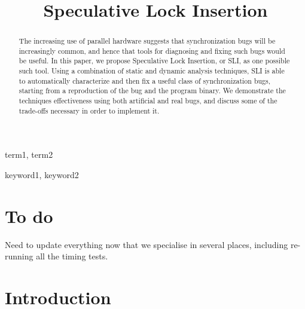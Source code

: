 \documentclass[10pt,twocolumn,preprint,natbib,authoryear]{sigplanconf}
\begin{document}
\copyrightdata{[to be supplied]} 


\title{Speculative Lock Insertion}

\authorinfo{}{}{}

\maketitle

\begin{abstract}

The increasing use of parallel hardware suggests that synchronization
bugs will be increasingly common, and hence that tools for diagnosing
and fixing such bugs would be useful.  In this paper, we propose
Speculative Lock Insertion, or SLI, as one possible such tool.  Using
a combination of static and dynamic analysis techniques, SLI is able
to automatically characterize and then fix a useful class of
synchronization bugs, starting from a reproduction of the bug and the
program binary.  We demonstrate the techniques effectiveness using
both artificial and real bugs, and discuss some of the trade-offs
necessary in order to implement it.

\end{abstract}


\terms
term1, term2

\keywords
keyword1, keyword2

\section{To do}

Need to update everything now that we specialise in several places,
including re-running all the timing tests.

\section{Introduction}
\end{document}
